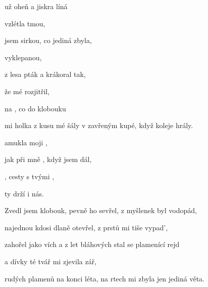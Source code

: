 

\zs
{} už oheň a jiskra líná

 vzlétla tmou,

 jsem sirkou, co jediná zbyla,

 vyklepanou,

z lesa  pták a krákoral tak,

že  mé rozjitřil,

na , co do klobouku

mi  holka z kusu mé šály v zavřeným kupé, když koleje hrály.
\ks


\zr
{} amukla moji ,

jak  při mně , když  jsem dál,

, cesty  s tvými ,

ty  drží   i nás.
\kr

\zs
Zvedl jsem klobouk, pevně ho sevřel, z myšlenek byl vodopád,

najednou kdosi dlaně otevřel, z prstů mi tiše vypad',

zahořel jako vích a z let bláhových stal se plamenící rejd

a dívky té tvář mi zjevila zář,

rudých plamenů na konci léta, na rtech mi zbyla jen jediná věta.
\ks

\zr
\kr

\kp







